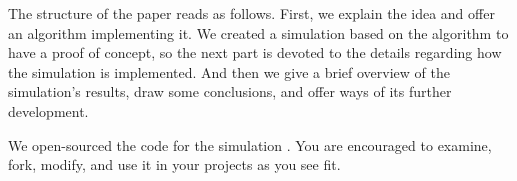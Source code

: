 The structure of the paper reads as follows. First, we explain the idea and offer an algorithm implementing it. We
created a simulation based on the algorithm to have a proof of concept, so the next part is devoted to the details
regarding how the simulation is implemented. And then we give a brief overview of the simulation's results, draw some
conclusions, and offer ways of its further development.

We open-sourced the code for the simulation \cite{github}. You are encouraged to examine, fork, modify, and use
it in your projects as you see fit.
